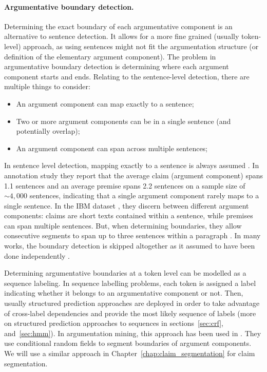 \paragraph{Argumentative boundary detection.} Determining the exact boundary of
each argumentative component is an alternative to sentence detection. It allows
for a more fine grained (usually token-level) approach, as using sentences
might not fit the argumentation structure (or definition of the elementary
argument component).  The problem in argumentative boundary detection is
determining where each argument component starts and ends.
Relating to the sentence-level detection, there are 
multiple things to consider:
\begin{itemize}
\item An argument component can map exactly to a sentence;
\item Two or more argument components can be in a single sentence (and potentially overlap);
\item An argument component can span across multiple sentences;
\end{itemize}
In sentence level detection, mapping exactly to a sentence is always assumed
\citep{palau2009argumentation, levy2014context}. 
In \citep{habernal2014argumentation} annotation study they report
that the average claim (argument component) spans 1.1 sentences and an average
premise spans 2.2 sentences on a sample size of ${\sim}4,000$ sentences,
indicating that a single argument component 
rarely maps to a single sentence. In the IBM dataset \citep{levy2014context},
they discern between different argument components: claims are short texts
contained within a sentence, while premises can span multiple sentences. But, when
determining boundaries, they allow consecutive segments to span up to three
sentences within a paragraph \citep{rinott2015show}.
In many works, the boundary detection is skipped altogether as it assumed to have
been done independently \citep{stab2014identifying, eckle2015role}. 

Determining argumentative boundaries at a token level can be modelled as a
sequence labeling. In sequence labelling problems, each token is assigned a
label indicating whether it belongs to an argumentative component or not.
Then, usually structured prediction approaches are deployed in order to take
advantage of cross-label
dependencies and provide the most likely sequence of labels
(more on structured prediction approaches to sequences
in sections~\ref{sec:crf}, and~\ref{sec:hmm}).  In argumentation mining, this
approach has been used in \citep{goudas2014argument, sardianos2015argument,
park2015conditional}.  They use conditional random fields to segment boundaries
of argument components.  We will use a similar approach in
Chapter~\ref{chap:claim_segmentation} for claim segmentation. 

